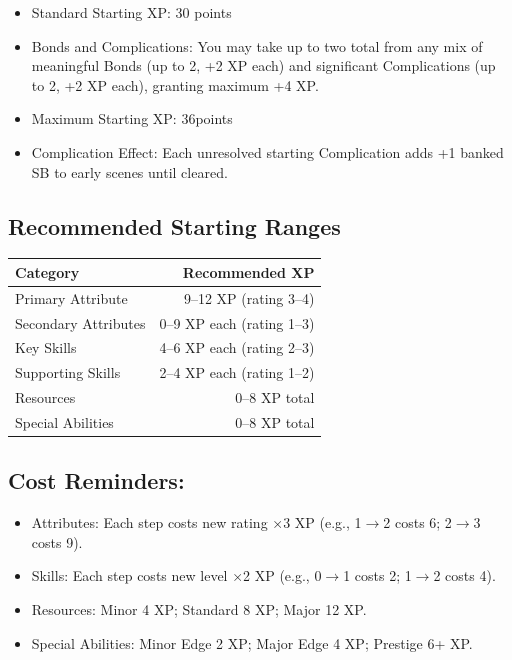 \documentclass[11pt,twoside,openany]{book}
\begin{document}
\begin{itemize}
\item Standard Starting XP: 30 points
\item Bonds and Complications: You may take up to two total from any mix of meaningful Bonds (up to 2, +2 XP each) and significant Complications (up to 2, +2 XP each), granting maximum +4 XP.
\item Maximum Starting XP: 36points
\item Complication Effect: Each unresolved starting Complication adds +1 banked SB to early scenes until cleared.
\end{itemize}

\subsection*{Recommended Starting Ranges}

\begin{center}
\begin{tabular}{|l|r|}
\hline
\textbf{Category} & \textbf{Recommended XP} \\
\hline
Primary Attribute & 9--12 XP (rating 3--4) \\
Secondary Attributes & 0--9 XP each (rating 1--3) \\
Key Skills & 4--6 XP each (rating 2--3) \\
Supporting Skills & 2--4 XP each (rating 1--2) \\
Resources & 0--8 XP total \\
Special Abilities & 0--8 XP total \\
\hline
\end{tabular}
\end{center}

\subsection*{Cost Reminders:}

\begin{itemize}
\item Attributes: Each step costs new rating ×3 XP (e.g., 1$\rightarrow$2 costs 6; 2$\rightarrow$3 costs 9).
\item Skills: Each step costs new level ×2 XP (e.g., 0$\rightarrow$1 costs 2; 1$\rightarrow$2 costs 4).
\item Resources: Minor 4 XP; Standard 8 XP; Major 12 XP.
\item Special Abilities: Minor Edge 2 XP; Major Edge 4 XP; Prestige 6+ XP.
\end{itemize}
\end{document}
